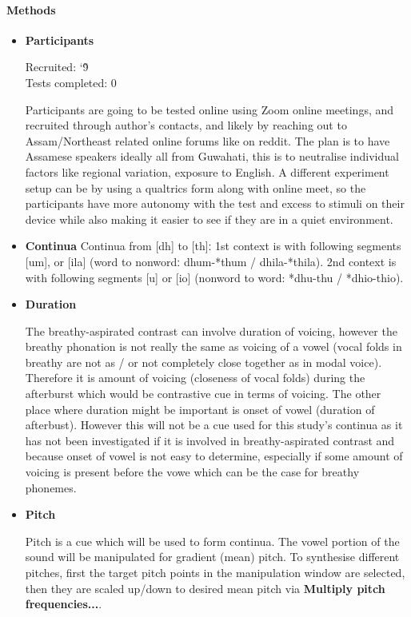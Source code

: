 \documentclass[12pt, english]{article}
\begin{document}
\paragraph{Methods}
\begin{itemize}
    \item \textbf{Participants} \par
    Recruited: \char`\~ 9 \\
    Tests completed: 0 \par
    Participants are going to be tested online using Zoom online meetings, and recruited through author's contacts, and likely by reaching out to Assam/Northeast related online forums like on reddit. The plan is to have Assamese speakers ideally all from Guwahati, this is to neutralise individual factors like regional variation, exposure to English. A different experiment setup can be by using a qualtrics form along with online meet, so the participants have more autonomy with the test and excess to stimuli on their device while also making it easier to see if they are in a quiet environment. \par
    \item \textbf{Continua}
    Continua from [dh] to [th]ː 1st context is with following segments [um], or [ila] (word to nonwordː dhum-*thum / dhila-*thila). 2nd context is with following segments [u] or [io] (nonword to word: *dhu-thu / *dhio-thio). \par
    \item \textbf{Duration} \par
    The breathy-aspirated contrast can involve duration of voicing, however the breathy phonation is not really the same as voicing of a vowel (vocal folds in breathy are not as / or not completely close together as in modal voice). Therefore it is amount of voicing (closeness of vocal folds) during the afterburst which would be contrastive cue in terms of voicing. The other place where duration might be important is onset of vowel (duration of afterbust). However this will not be a cue used for this study's continua as it has not been investigated if it is involved in breathy-aspirated contrast and because onset of vowel is not easy to determine, especially if some amount of voicing is present before the vowe which can be the case for breathy phonemes.  \par
    \item \textbf{Pitch} \par
    Pitch is a cue which will be used to form continua. The vowel portion of the sound will be manipulated for gradient (mean) pitch. To synthesise different pitches, first the target pitch points in the manipulation window are selected, then they are scaled up/down to desired mean pitch via \textbf{Multiply pitch frequencies...}. \par

\end{itemize}
\end{document}
